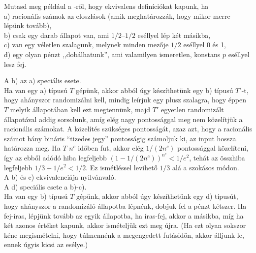 \begin{Exercise}[counter={sorszam}, difficulty=0]
	Mutasd meg p\'eld\'aul a \BPP -r\H ol, hogy ekvivalens defin\'ici\'okat kapunk, ha\\
	a) racion\'alis sz\'amok az eloszl\'asok (amik meghat\'arozz\'ak, hogy mikor merre l\'ep\"unk tov\'abb),\\
	b) csak egy darab \'allapot van, ami $1/2$--$1/2$ es\'ellyel l\'ep k\'et m\'asikba,\\
	c) van egy v\'eletlen szalagunk, melynek minden mez\H oje $1/2$ es\'ellyel 0 \'es 1,\\
	d) egy olyan p\'enzt ,,dob\'alhatunk'', ami valamilyen ismeretlen, konstans $p$ es\'ellyel lesz fej.
\end{Exercise}	
\begin{Answer}
	A b) az a) speci\'alis esete.\\
	Ha van egy a) t\'ipus\'u $T$ g\'ep\"unk, akkor abb\'ol \'ugy k\'esz\'ithet\"unk egy b) t\'ipus\'u $T'$-t, hogy ah\'anyszor randomiz\'alni kell, mindig le\'irjuk egy plusz szalagra, hogy \'eppen $T$ melyik \'allapot\'aban kell ezt megtenn\"unk, majd $T'$ egyetlen randomiz\'alt \'allapot\'aval addig sorsolunk, am\'ig el\'eg nagy pontoss\'aggal meg nem k\"ozel\'itj\"uk a racion\'alis sz\'amokat.
	A k\"ozel\'it\'es sz\"uks\'eges pontoss\'ag\'at, azaz azt, hogy a racion\'alis sz\'amot h\'any bin\'aris ``tizedes jegy'' pontoss\'agig sz\'amoljuk ki, az input hossza hat\'arozza meg.
	Ha $T$ $n^c$ id\H oben fut, akkor el\'eg $1/(2n^c)$ pontoss\'aggal k\"ozel\'iteni, \'igy az ebb\H ol ad\'od\'o hiba legfeljebb $(1-1/(2n^c))^{n^c}<1/e^2$, teh\'at az \"osszhiba legfeljebb $1/3+1/e^2<1/2$.
	Ez ism\'etl\'essel levihet\H o $1/3$ al\'a a szok\'asos m\'odon.\\
	A b) \'es c) ekvivalenci\'aja nyilv\'anval\'o.\\
	A d) speci\'alis esete a b)-c).\\
	Ha van egy b) t\'ipus\'u $T$ g\'ep\"unk, akkor abb\'ol \'ugy k\'esz\'ithet\"unk egy d) t\'ipus\'ut, hogy ah\'anyszor a randomiz\'al\'o \'allapotba l\'epn\'enk, dobjuk fel a p\'enzt k\'etszer.
	Ha fej-\'iras, l\'epj\"unk tov\'abb az egyik \'allapotba, ha \'iras-fej, akkor a m\'asikba, m\'ig ha k\'et azonos \'ert\'eket kapunk, akkor ism\'etelj\"uk ezt meg \'ujra.
	(Ha ezt olyan sokszor k\'ene megism\'etelni, hogy t\'ulmenn\'enk a megengedett fut\'asid\H on, akkor \'alljunk le, ennek \'ugyis kicsi az es\'elye.)
\end{Answer}

